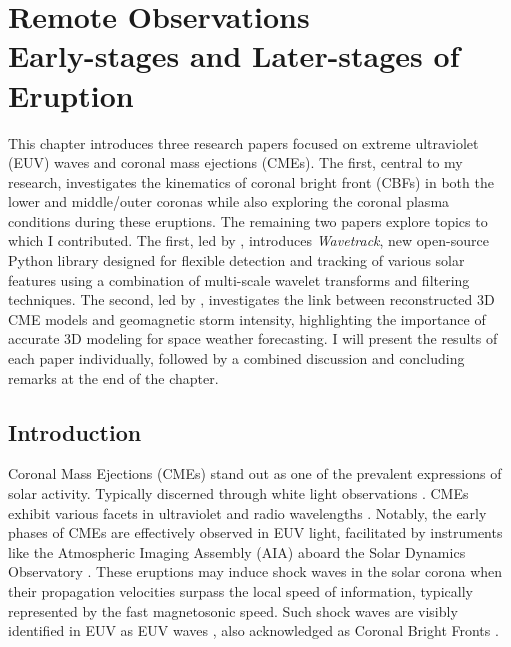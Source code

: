 \chapter{Remote Observations\\{\fontsize{20}{15}\selectfont Early-stages and Later-stages of Eruption}}
\label{chapter2}
This chapter introduces three research papers focused on extreme ultraviolet (EUV) waves and coronal mass ejections (CMEs). The first, central to my research, investigates the kinematics of coronal bright front (CBFs) in both the lower and middle/outer coronas while also exploring the coronal plasma conditions during these eruptions.
The remaining two papers explore topics to which I contributed. The first, led by \citet{stepanyuk_2022}, introduces \textit{Wavetrack}, new open-source Python library designed for flexible detection and tracking of various solar features using a combination of multi-scale wavelet transforms and filtering techniques. The second, led by \citet{miteva_2023}, investigates the link between reconstructed 3D CME models and geomagnetic storm intensity, highlighting the importance of accurate 3D modeling for space weather forecasting.
I will present the results of each paper individually, followed by a combined discussion and concluding remarks at the end of the chapter.


\section{Introduction}
Coronal Mass Ejections (CMEs) stand out as one of the prevalent expressions of solar activity. Typically discerned through white light observations \citep{vourlidas_2003, zhang_2006, bein_2011}. CMEs exhibit various facets in ultraviolet and radio wavelengths \citep{bastian_2001, veronig_2010}. Notably, the early phases of CMEs are effectively observed in EUV light, facilitated by instruments like the Atmospheric Imaging Assembly (AIA) aboard the Solar Dynamics Observatory \citep[SDO]{lemen_2011, pesnell_2012}. These eruptions may induce shock waves in the solar corona when their propagation velocities surpass the local speed of information, typically represented by the fast magnetosonic speed. Such shock waves are visibly identified in EUV as EUV waves \citep{thompson_1998}, also acknowledged as Coronal Bright Fronts \citep[CBFs]{long_2011}.


